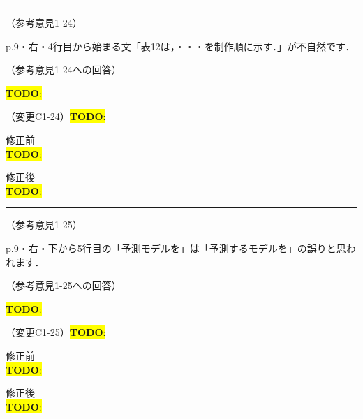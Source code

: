 \documentclass{jarticle} %
\newcommand{\todo}[1]{\colorbox{yellow}{{\bf TODO}:}{\color{blue}{\textbf{[#1]}}}}
\def\subsection#1{ \vspace{1pc} {\gt #1} }
\def\nextans{ \vspace{2pc} \hrule }
\begin{document}
\newpage
\nextans
\subsection{（参考意見1-24）}

p.9・右・4行目から始まる文「表12は，・・・を制作順に示す．」が不自然です．

\subsection{（参考意見1-24への回答）}

\todo{hoge}

\subsection{（変更C1-24）\todo{hoge}}
\vspace{-0.3cm}
\begin{description}
\item 修正前\\
\phantom{　}
\todo{hoge}
\vspace{-0.3cm}
\item 修正後\\
\phantom{　}
\todo{hoge}
\end{description}

\newpage
\nextans
\subsection{（参考意見1-25）}

p.9・右・下から5行目の「予測モデルを」は「予測するモデルを」の誤りと思われます．

\subsection{（参考意見1-25への回答）}

\todo{hoge}

\subsection{（変更C1-25）\todo{hoge}}
\vspace{-0.3cm}
\begin{description}
\item 修正前\\
\phantom{　}
\todo{hoge}
\vspace{-0.3cm}
\item 修正後\\
\phantom{　}
\todo{hoge}
\end{description}
\end{document}

